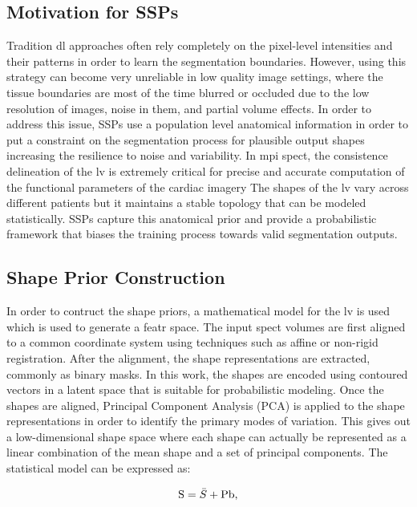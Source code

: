 \subsection{Motivation for SSPs}
Tradition \gls{dl} approaches often rely completely on the pixel-level intensities and their patterns in order to learn the segmentation boundaries. However, using this strategy can become very unreliable in low quality image settings, where the tissue boundaries are most of the time blurred or occluded due to the low resolution of images, noise in them, and partial volume effects. In order to address this issue, SSPs use a population level anatomical information in order to put a constraint on the segmentation process for plausible output shapes increasing the resilience to noise and variability. In \gls{mpi} \gls{spect}, the consistence delineation of the \gls{lv} is extremely critical for precise and accurate computation of the functional parameters of the cardiac imagery The shapes of the \gls{lv} vary across different patients but it maintains a stable topology that can be modeled statistically. SSPs capture this anatomical prior and provide a probabilistic framework that biases the training process towards valid segmentation outputs.

\subsection{Shape Prior Construction}
In order to contruct the shape priors, a mathematical model for the \gls{lv} is used which is used to generate a featr space. The input \gls{spect} volumes are first aligned to a common coordinate system using techniques such as affine or non-rigid registration. After the alignment, the shape representations are extracted, commonly as binary masks. In this work, the shapes are encoded using contoured vectors in a latent space that is suitable for probabilistic modeling. Once the shapes are aligned, Principal Component Analysis (PCA) is applied to the shape representations in order to identify the primary modes of variation. This gives out a low-dimensional shape space where each shape can actually be represented as a linear combination of the mean shape and a set of principal components. The statistical model can be expressed as:

\begin{equation} 
\addcontentsline{equ}{equations}{\protect\numberline{\theequation}Statistical Shape Model}
\text{S} = \bar{S} + \text{Pb}, 
\end{equation} 

